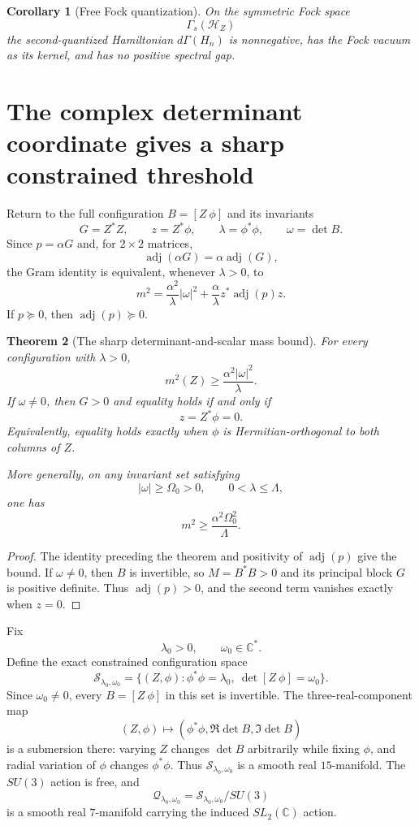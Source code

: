 \documentclass[11pt]{article}
\newtheorem{theorem}{Theorem}[section]
\newtheorem{corollary}[theorem]{Corollary}
\theoremstyle{definition}
\newcommand{\C}{\mathbb C}
\newcommand{\adj}{\operatorname{adj}}
\newcommand{\cH}{\mathscr H}
\newcommand{\cQ}{\mathscr Q}
\newcommand{\cS}{\mathscr S}
\begin{document}
\begin{corollary}[Free Fock quantization]\label{cor:fock-unconstrained}
On the symmetric Fock space
\[
 \Gamma_s(\cH_Z)
\]
the second-quantized Hamiltonian $d\Gamma(H_n)$ is nonnegative, has the Fock vacuum as its kernel, and has no positive spectral gap.
\end{corollary}

\section{The complex determinant coordinate gives a sharp constrained threshold}

Return to the full configuration $B=[Z\ \phi]$ and its invariants
\[
 G=Z^*Z,\qquad z=Z^*\phi,
 \qquad\lambda=\phi^*\phi,
 \qquad\omega=\det B.
\]
Since $p=\alpha G$ and, for $2\times2$ matrices,
\[
 \adj(\alpha G)=\alpha\adj(G),
\]
the Gram identity is equivalent, whenever $\lambda>0$, to
\[
 \boxed{
 m^2
 =\frac{\alpha^2}{\lambda}|\omega|^2
 +\frac{\alpha}{\lambda}z^*\adj(p)z.}
\]
If $p\succeq0$, then $\adj(p)\succeq0$.

\begin{theorem}[The sharp determinant-and-scalar mass bound]\label{thm:mass-bound}
For every configuration with $\lambda>0$,
\[
 \boxed{
 m^2(Z)\geq\frac{\alpha^2|\omega|^2}{\lambda}.}
\]
If $\omega\neq0$, then $G>0$ and equality holds if and only if
\[
 z=Z^*\phi=0.
\]
Equivalently, equality holds exactly when $\phi$ is Hermitian-orthogonal to both columns of $Z$.

More generally, on any invariant set satisfying
\[
 |\omega|\geq\Omega_0>0,
 \qquad
 0<\lambda\leq\Lambda,
\]
one has
\[
 \boxed{
 m^2\geq\frac{\alpha^2\Omega_0^2}{\Lambda}.}
\]
\end{theorem}

\begin{proof}
The identity preceding the theorem and positivity of $\adj(p)$ give the bound.  If $\omega\neq0$, then $B$ is invertible, so $M=B^*B>0$ and its principal block $G$ is positive definite.  Thus $\adj(p)>0$, and the second term vanishes exactly when $z=0$.
\end{proof}

Fix
\[
 \lambda_0>0,
 \qquad
 \omega_0\in\C^*.
\]
Define the exact constrained configuration space
\[
 \cS_{\lambda_0,\omega_0}
 =\{(Z,\phi):\phi^*\phi=\lambda_0,
 \ \det[Z\ \phi]=\omega_0\}.
\]
Since $\omega_0\neq0$, every $B=[Z\ \phi]$ in this set is invertible.  The three-real-component map
\[
 (Z,\phi)\longmapsto
 (\phi^*\phi,\Re\det B,\Im\det B)
\]
is a submersion there: varying $Z$ changes $\det B$ arbitrarily while fixing $\phi$, and radial variation of $\phi$ changes $\phi^*\phi$.  Thus $\cS_{\lambda_0,\omega_0}$ is a smooth real $15$-manifold.  The $SU(3)$ action is free, and
\[
 \cQ_{\lambda_0,\omega_0}
 =\cS_{\lambda_0,\omega_0}/SU(3)
\]
is a smooth real $7$-manifold carrying the induced $SL_2(\C)$ action.
\end{document}
